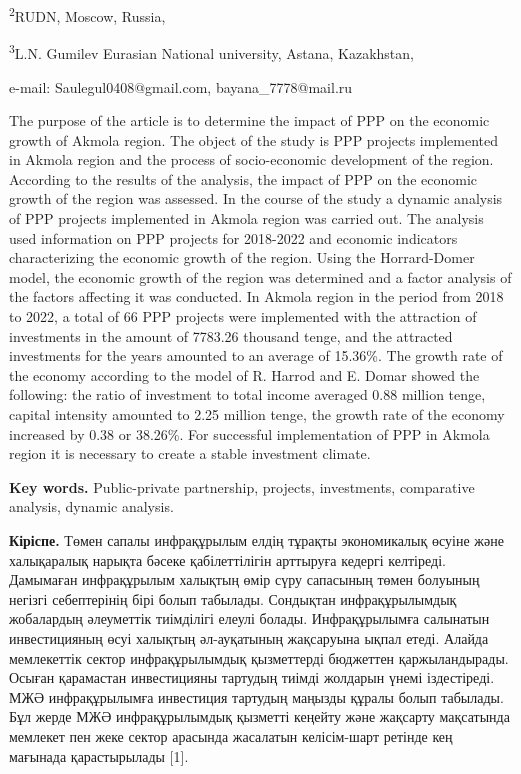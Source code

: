 \textsuperscript{2}RUDN, Moscow, Russia,

\textsuperscript{3}L.N. Gumilev Eurasian National university, Astana,
Kazakhstan,

e-mail: Saulegul0408@gmail.com, bayana\_7778@mail.ru

The purpose of the article is to determine the impact of PPP on the
economic growth of Akmola region. The object of the study is PPP
projects implemented in Akmola region and the process of socio-economic
development of the region. According to the results of the analysis, the
impact of PPP on the economic growth of the region was assessed. In the
course of the study a dynamic analysis of PPP projects implemented in
Akmola region was carried out. The analysis used information on PPP
projects for 2018-2022 and economic indicators characterizing the
economic growth of the region. Using the Horrard-Domer model, the
economic growth of the region was determined and a factor analysis of
the factors affecting it was conducted. In Akmola region in the period
from 2018 to 2022, a total of 66 PPP projects were implemented with the
attraction of investments in the amount of 7783.26 thousand tenge, and
the attracted investments for the years amounted to an average of
15.36\%. The growth rate of the economy according to the model of R.
Harrod and E. Domar showed the following: the ratio of investment to
total income averaged 0.88 million tenge, capital intensity amounted to
2.25 million tenge, the growth rate of the economy increased by 0.38 or
38.26\%. For successful implementation of PPP in Akmola region it is
necessary to create a stable investment climate.

{\bfseries Key words.} Public-private partnership, projects, investments,
comparative analysis, dynamic analysis.

{\bfseries Кіріспе.} Төмен сапалы инфрақұрылым елдің тұрақты экономикалық
өсуіне және халықаралық нарықта бәсеке қабілеттілігін арттыруға кедергі
келтіреді. Дамымаған инфрақұрылым халықтың өмір сүру сапасының төмен
болуының негізгі себептерінің бірі болып табылады. Сондықтан
инфрақұрылымдық жобалардың әлеуметтік тиімділігі елеулі болады.
Инфрақұрылымға салынатын инвестицияның өсуі халықтың әл-ауқатының
жақсаруына ықпал етеді. Алайда мемлекеттік сектор инфрақұрылымдық
қызметтерді бюджеттен қаржыландырады. Осыған қарамастан инвестицияны
тартудың тиімді жолдарын үнемі іздестіреді. МЖӘ инфрақұрылымға
инвестиция тартудың маңызды құралы болып табылады. Бұл жерде МЖӘ
инфрақұрылымдық қызметті кеңейту және жақсарту мақсатында мемлекет пен
жеке сектор арасында жасалатын келісім-шарт ретінде кең мағынада
қарастырылады {[}1{]}.~

